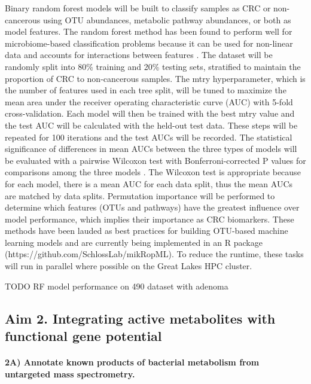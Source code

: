 \documentclass[11pt]{article}
\begin{document}
Binary random forest models will be built to classify samples as CRC or non-cancerous using OTU abundances, metabolic pathway abundances, or both as model features.
The random forest method has been found to perform well for microbiome-based classification problems because it can be used for non-linear data and accounts for interactions between features \cite{baxter_microbiota-based_2016}.
The dataset will be randomly split into 80\% training and 20\% testing sets, stratified to maintain the proportion of CRC to non-cancerous samples.
The mtry hyperparameter, which is the number of features used in each tree split, will be tuned to maximize the mean area under the receiver operating characteristic curve (AUC) with 5-fold cross-validation.
Each model will then be trained with the best mtry value and the test AUC will be calculated with the held-out test data.
These steps will be repeated for 100 iterations and the test AUCs will be recorded.
The statistical significance of differences in mean AUCs between the three types of models will be evaluated with a pairwise Wilcoxon test with Bonferroni-corrected P values for comparisons among the three models \cite{hannigan_diagnostic_2018}.
The Wilcoxon test is appropriate because for each model, there is a mean AUC for each data split, thus the mean AUCs are matched by data splits.
Permutation importance will be performed to determine which features (OTUs and pathways) have the greatest influence over model performance, which implies their importance as CRC biomarkers.
These methods have been lauded as best practices for building OTU-based machine learning models \cite{topcuoglu_framework_2020} and are currently being implemented in an R package (https://github.com/SchlossLab/mikRopML).
To reduce the runtime, these tasks will run in parallel where possible on the Great Lakes HPC cluster.

TODO RF model performance on 490 dataset with adenoma

\subsection*{Aim 2. Integrating active metabolites with functional gene potential}

\paragraph{2A) Annotate known products of bacterial metabolism from untargeted mass spectrometry.}
\end{document}
